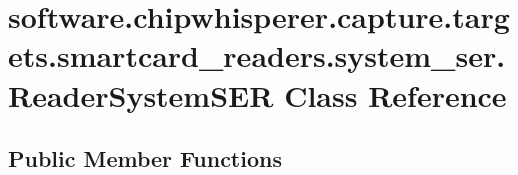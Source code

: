 \hypertarget{classsoftware_1_1chipwhisperer_1_1capture_1_1targets_1_1smartcard__readers_1_1system__ser_1_1ReaderSystemSER}{}\section{software.\+chipwhisperer.\+capture.\+targets.\+smartcard\+\_\+readers.\+system\+\_\+ser.\+Reader\+System\+S\+E\+R Class Reference}
\label{classsoftware_1_1chipwhisperer_1_1capture_1_1targets_1_1smartcard__readers_1_1system__ser_1_1ReaderSystemSER}
\subsection*{Public Member Functions}
